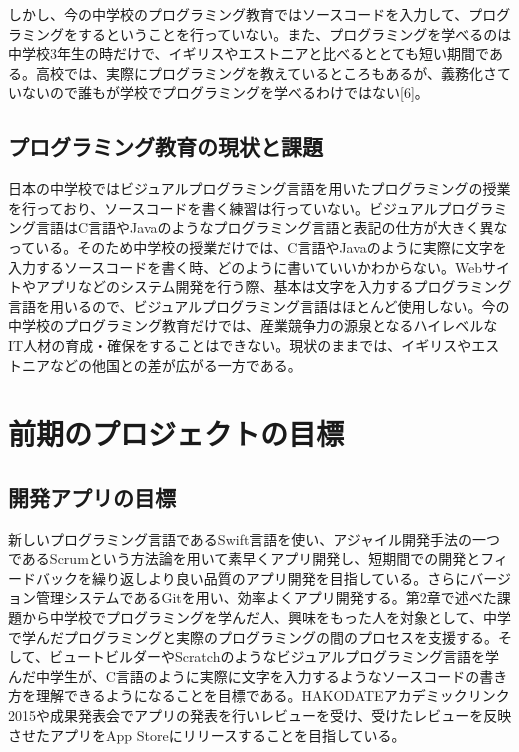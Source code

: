\documentclass[openany,11pt,papersize]{jsbook}
\begin{document}
しかし、今の中学校のプログラミング教育ではソースコードを入力して、プログラミングをするということを行っていない。また、プログラミングを学べるのは中学校3年生の時だけで、イギリスやエストニアと比べるととても短い期間である。高校では、実際にプログラミングを教えているところもあるが、義務化さていないので誰もが学校でプログラミングを学べるわけではない[6]。

\section{プログラミング教育の現状と課題}
日本の中学校ではビジュアルプログラミング言語を用いたプログラミングの授業を行っており、ソースコードを書く練習は行っていない。ビジュアルプログラミング言語はC言語やJavaのようなプログラミング言語と表記の仕方が大きく異なっている。そのため中学校の授業だけでは、C言語やJavaのように実際に文字を入力するソースコードを書く時、どのように書いていいかわからない。Webサイトやアプリなどのシステム開発を行う際、基本は文字を入力するプログラミング言語を用いるので、ビジュアルプログラミング言語はほとんど使用しない。今の中学校のプログラミング教育だけでは、産業競争力の源泉となるハイレベルな IT人材の育成・確保をすることはできない。現状のままでは、イギリスやエストニアなどの他国との差が広がる一方である。

\chapter{前期のプロジェクトの目標}
\section{開発アプリの目標}
%
新しいプログラミング言語であるSwift言語を使い、アジャイル開発手法の一つであるScrumという方法論を用いて素早くアプリ開発し、短期間での開発とフィードバックを繰り返しより良い品質のアプリ開発を目指している。さらにバージョン管理システムであるGitを用い、効率よくアプリ開発する。第2章で述べた課題から中学校でプログラミングを学んだ人、興味をもった人を対象として、中学で学んだプログラミングと実際のプログラミングの間のプロセスを支援する。そして、ビュートビルダーやScratchのようなビジュアルプログラミング言語を学んだ中学生が、C言語のように実際に文字を入力するようなソースコードの書き方を理解できるようになることを目標である。HAKODATEアカデミックリンク2015や成果発表会でアプリの発表を行いレビューを受け、受けたレビューを反映させたアプリをApp Storeにリリースすることを目指している。
\end{document}
